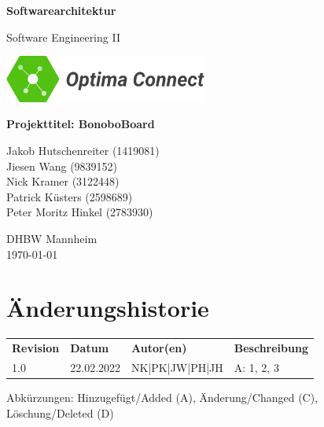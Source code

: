 \documentclass[a4paper,11pt]{scrartcl}
\begin{document}
\renewcommand*{\arraystretch}{1.2}
\begin{titlepage}
    \begin{center}
        \vspace*{1cm}\Huge
        \textbf{Softwarearchitektur}\par
        \vspace{0.5cm}\LARGE        
        Software Engineering II\par           
        \vspace{2cm}
        \includegraphics[width=0.5\textwidth]{OptimaLogo_long}\par   
        \vspace{1cm}
        \textbf{Projekttitel: BonoboBoard}\par        
        \vfill\Large   
        Jakob Hutschenreiter (1419081)\\Jiesen Wang (9839152)\\Nick Kramer (3122448)\\Patrick Küsters (2598689)\\Peter Moritz Hinkel (2783930)\par
        \vspace{2cm}
        DHBW Mannheim\\
        \today     
    \end{center}
\end{titlepage}

\section*{Änderungshistorie}
\begin{table}[h]
	\begin{tabular}{@{} p{20mm} p{25mm} p{35mm} p{75mm}}
		\textbf{Revision} & \textbf{Datum} & \textbf{Autor(en)} & \textbf{Beschreibung}\\
		1.0 & 22.02.2022 & NK|PK|JW|PH|JH & A: 1, 2, 3\\
	\end{tabular}
\end{table}
\noindent
Abkürzungen: Hinzugefügt/Added (A), Änderung/Changed (C), Löschung/Deleted (D)
\vspace{2cm}
\tableofcontents
\newpage
{}
\end{document}
